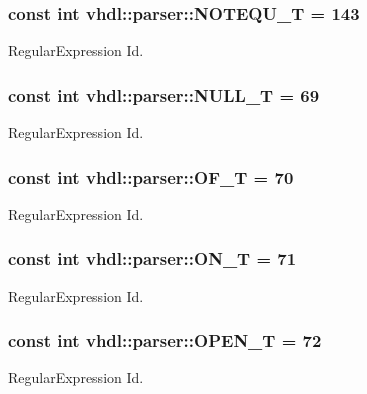 \subsubsection[{N\+O\+T\+E\+Q\+U\+\_\+\+T}]{\setlength{\rightskip}{0pt plus 5cm}const int vhdl\+::parser\+::\+N\+O\+T\+E\+Q\+U\+\_\+\+T = 143}\label{namespacevhdl_1_1parser_a5002a05549b33e7c4fc8732a8be36884}
Regular\+Expression Id. \hypertarget{namespacevhdl_1_1parser_aadf3e2ce5024a655cc3a940111c4d33f}{}
\subsubsection[{N\+U\+L\+L\+\_\+\+T}]{\setlength{\rightskip}{0pt plus 5cm}const int vhdl\+::parser\+::\+N\+U\+L\+L\+\_\+\+T = 69}\label{namespacevhdl_1_1parser_aadf3e2ce5024a655cc3a940111c4d33f}
Regular\+Expression Id. \hypertarget{namespacevhdl_1_1parser_a2fb8268e515d8e165d5794bee09f7874}{}
\subsubsection[{O\+F\+\_\+\+T}]{\setlength{\rightskip}{0pt plus 5cm}const int vhdl\+::parser\+::\+O\+F\+\_\+\+T = 70}\label{namespacevhdl_1_1parser_a2fb8268e515d8e165d5794bee09f7874}
Regular\+Expression Id. \hypertarget{namespacevhdl_1_1parser_a8a8bdb77c76721a0cfe8693c654a992c}{}
\subsubsection[{O\+N\+\_\+\+T}]{\setlength{\rightskip}{0pt plus 5cm}const int vhdl\+::parser\+::\+O\+N\+\_\+\+T = 71}\label{namespacevhdl_1_1parser_a8a8bdb77c76721a0cfe8693c654a992c}
Regular\+Expression Id. \hypertarget{namespacevhdl_1_1parser_a7e0e0a800f4a494129dde0ef24f45012}{}
\subsubsection[{O\+P\+E\+N\+\_\+\+T}]{\setlength{\rightskip}{0pt plus 5cm}const int vhdl\+::parser\+::\+O\+P\+E\+N\+\_\+\+T = 72}\label{namespacevhdl_1_1parser_a7e0e0a800f4a494129dde0ef24f45012}
Regular\+Expression Id. \hypertarget{namespacevhdl_1_1parser_ade02696fa8fd8af1856742d97bda56cd}{}
